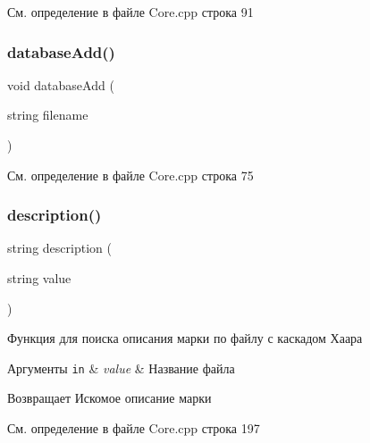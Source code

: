 См. определение в файле Core.\+cpp строка 91

\mbox{\label{group__corecpp_ga10a0271bceabc9c1a0d736ab93113212}} 
\subsubsection{\texorpdfstring{database\+Add()}{databaseAdd()}}
{\footnotesize\ttfamily void database\+Add (\begin{DoxyParamCaption}\item[{string}]{filename }\end{DoxyParamCaption})}



См. определение в файле Core.\+cpp строка 75

\mbox{\label{group__corecpp_gaa85ae460901348b74381239ce0517d5f}} 
\subsubsection{\texorpdfstring{description()}{description()}}
{\footnotesize\ttfamily string description (\begin{DoxyParamCaption}\item[{string}]{value }\end{DoxyParamCaption})}



Функция для поиска описания марки по файлу с каскадом Хаара 


\begin{DoxyParams}[1]{Аргументы}
\mbox{\tt in}  & {\em value} & Название файла \\
\hline
\end{DoxyParams}
\begin{DoxyReturn}{Возвращает}
Искомое описание марки 
\end{DoxyReturn}


См. определение в файле Core.\+cpp строка 197

\mbox{\label{group__corecpp_gae99907f19e7f09055012f68347a57d05}} 
